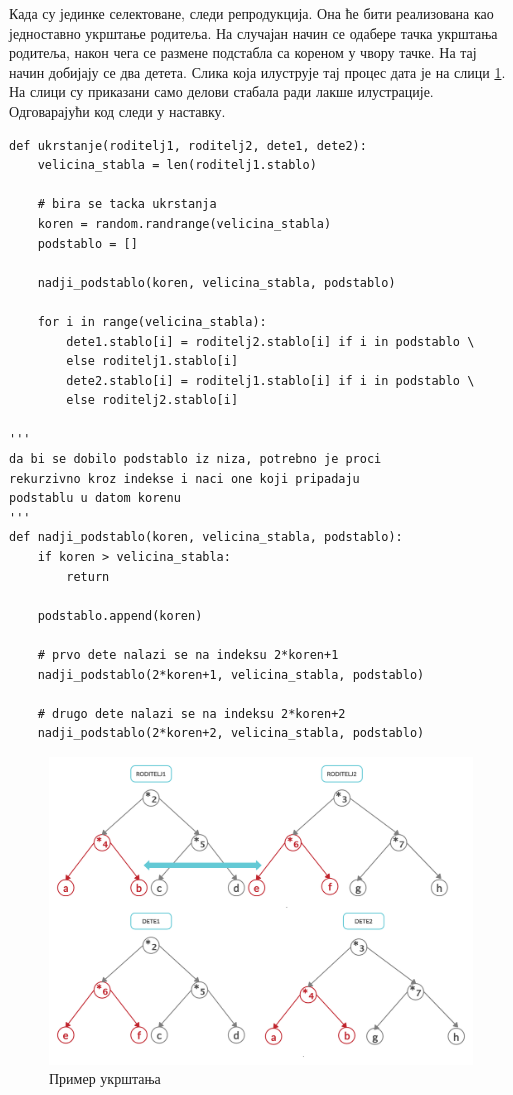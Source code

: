 \documentclass[a4paper]{article}
\begin{document}
Када су јединке селектоване, следи репродукција. Она ће бити реализована као једноставно укрштање родитеља. На случајан начин се одабере тачка укрштања родитеља, након чега се размене подстабла са кореном у чвору тачке. На тај начин добијају се два детета. Слика која илуструје тај процес дата је на слици \ref{fig:ukrstanje}. На слици су приказани само делови стабала ради лакше илустрације. Одговарајући код следи у наставку.

\bigskip
\begin{lstlisting}[frame=single]
def ukrstanje(roditelj1, roditelj2, dete1, dete2):
    velicina_stabla = len(roditelj1.stablo)
    
    # bira se tacka ukrstanja
    koren = random.randrange(velicina_stabla)
    podstablo = []
    
    nadji_podstablo(koren, velicina_stabla, podstablo)

    for i in range(velicina_stabla):
        dete1.stablo[i] = roditelj2.stablo[i] if i in podstablo \
        else roditelj1.stablo[i]
        dete2.stablo[i] = roditelj1.stablo[i] if i in podstablo \
        else roditelj2.stablo[i]
        
''' 
da bi se dobilo podstablo iz niza, potrebno je proci 
rekurzivno kroz indekse i naci one koji pripadaju
podstablu u datom korenu
'''
def nadji_podstablo(koren, velicina_stabla, podstablo):
    if koren > velicina_stabla:
        return

    podstablo.append(koren)
    
    # prvo dete nalazi se na indeksu 2*koren+1
    nadji_podstablo(2*koren+1, velicina_stabla, podstablo)
    
    # drugo dete nalazi se na indeksu 2*koren+2
    nadji_podstablo(2*koren+2, velicina_stabla, podstablo)
\end{lstlisting}

\begin{figure}[ht!]
    \begin{center}
    \includegraphics[scale=0.16]{ukrstanje.png}
    \end{center}
    \caption{Пример укрштања}
    \label{fig:ukrstanje}
\end{figure}
\end{document}
